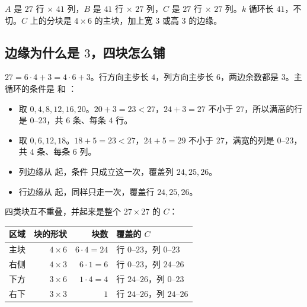 $A$ 是 $27$ 行 $\times$ $41$ 列，$B$ 是 $41$ 行 $\times$ $27$ 列，$C$ 是 $27$ 行 $\times$ $27$ 列。$k$ 循环长 $41$，不切。$C$ 上的分块是 $4\times6$ 的主块，加上宽 $3$ 或高 $3$ 的边缘。

\subsection{边缘为什么是 \texorpdfstring{$3$}{3}，四块怎么铺}
\label{sec:c3tile}

$27=6\cdot4+3=4\cdot6+3$。行方向主步长 $4$，列方向主步长 $6$，两边余数都是 $3$。主循环的条件是  和 ：

\begin{itemize}
  \item {} 取 $0,4,8,12,16,20$。$20+3=23<27$，$24+3=27$ 不小于 $27$，所以满高的行是 $0$--$23$，共 $6$ 条、每条 $4$ 行。
  \item {} 取 $0,6,12,18$。$18+5=23<27$，$24+5=29$ 不小于 $27$，满宽的列是 $0$--$23$，共 $4$ 条、每条 $6$ 列。
  \item 列边缘从  起，条件  只成立这一次，覆盖列 $24,25,26$。
  \item 行边缘从  起，同样只走一次，覆盖行 $24,25,26$。
\end{itemize}

四类块互不重叠，并起来是整个 $27\times27$ 的 $C$：

\begin{center}
\begin{tabular}{@{}lrrl@{}}
\toprule
区域 & 块的形状 & 块数 & 覆盖的 $C$\\
\midrule
主块 & $4\times6$ & $6\cdot4=24$ & 行 $0$--$23$，列 $0$--$23$\\
右侧 & $4\times3$ & $6\cdot1=6$ & 行 $0$--$23$，列 $24$--$26$\\
下方 & $3\times6$ & $1\cdot4=4$ & 行 $24$--$26$，列 $0$--$23$\\
右下 & $3\times3$ & $1$ & 行 $24$--$26$，列 $24$--$26$\\
\bottomrule
\end{tabular}
\end{center}

